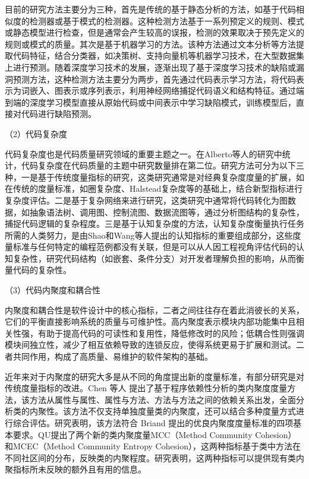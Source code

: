 目前的研究方法主要分为三种，首先是传统的基于静态分析的方法，如基于代码相似度的检测器\cite{Sheneamer2018A,2014A}或基于模式的检测器\cite{2012Mitigating,2017IDE,2016How}。这种检测方法基于一系列预定义的规则、模式或静态模型进行检查，但是通常会产生较高的误报，检测的效果取决于预先定义的规则或模式的质量。其次是基于机器学习的方法。该种方法通过文本分析等方法提取代码特征，结合分类器，如决策树、支持向量机等机器学习技术\cite{2017Assessment,2018A,2020The}，在大型数据集上进行预测。随着深度学习技术的发展，逐渐出现了基于深度学习技术的缺陷或漏洞预测方法，这种检测方法主要分为两步，首先通过代码表示学习方法，将代码表示为词嵌入、图表示或序列表示，利用神经网络捕捉代码语义和结构特征。通过端到端的深度学习模型直接从原始代码或中间表示中学习缺陷模式，训练模型后，直接对代码进行缺陷预测。


（2）代码复杂度

代码复杂度也是代码质量研究领域的重要主题之一。在Alberto等人\cite{NUNEZVARELA2017164}的研究中统计，代码复杂度在代码质量的主题中研究数量排在第二位。研究方法可分为以下三种，一是基于传统度量指标的研究，这类研究通常是对经典复杂度度量的扩展，如在传统的度量标准，如圈复杂度、Halstead复杂度等的基础上，结合新型指标进行复杂度评估。二是基于复杂网络来进行研究\cite{2015Exploring, 2012A}，这类研究中通常将代码转化为图数据，如抽象语法树、调用图、控制流图、数据流图等，通过分析图结构的复杂性，捕捉代码逻辑的复杂程度。三是基于认知复杂度的方法，认知复杂度衡量执行任务所需的人类努力\cite{2012Framework, 2012Asuite}，是由Shao和Wang\cite{2010Assessing}等人提出的认知指标的重要组成部分，这些度量标准与任何特定的编程范例都没有关联，但是可以从人因工程视角评估代码的认知复杂性，研究代码结构（如嵌套、条件分支）对开发者理解负担的影响，从而衡量代码的复杂性。


（3）代码内聚度和耦合性

内聚度和耦合性是软件设计中的核心指标，二者之间往往存在着此消彼长的关系，它们的平衡直接影响系统的质量与可维护性。高内聚度表示模块内部功能集中且相关性强，有助于提高代码的可读性和复用性，降低修改时的风险；低耦合性则强调模块间独立性，减少了相互依赖导致的连锁反应，使得系统更易于扩展和测试。二者共同作用，构成了高质量、易维护的软件架构的基础。

近年来对于内聚度的研究大多是从不同的角度提出新的度量标准，有部分研究是对传统度量指标的改进。Chen 等人 \cite{陈振强2003} 提出了基于程序依赖性分析的类内聚度度量方法，该方法从属性与属性、属性与方法、方法与方法之间的依赖关系出发，全面分析类的内聚性。该方法不仅支持单独度量类的内聚度，还可以结合多种度量方式进行综合评估。研究表明，该方法符合 Briand \cite{1997Property} 提出的优良内聚度度量标准的四项基本要求。QU\cite{QU2015193}提出了两个新的类内聚度量MCC（Method Community Cohesion）和MCEC（Method Community Entropy Cohesion），这两种指标基于类中方法在不同社区间的分布，反映类的内聚程度。研究表明，这两种指标可以提供现有类内聚指标所未反映的额外且有用的信息。


